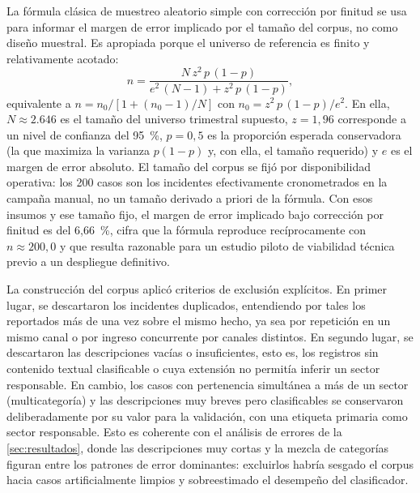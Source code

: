 La fórmula clásica de muestreo aleatorio simple con corrección por finitud se usa para informar el margen de error implicado por el tamaño del corpus, no como diseño muestral. Es apropiada porque el universo de referencia es finito y relativamente acotado:
\[
n = \frac{N\, z^{2}\, p\,(1-p)}{e^{2}\,(N-1) + z^{2}\, p\,(1-p)},
\]
equivalente a \(n = n_0 / [1 + (n_0 - 1)/N]\) con \(n_0 = z^{2}\, p\,(1-p)/e^{2}\). En ella, \(N \approx 2.646\) es el tamaño del universo trimestral supuesto, \(z = 1{,}96\) corresponde a un nivel de confianza del 95~\%, \(p = 0{,}5\) es la proporción esperada conservadora (la que maximiza la varianza \(p(1-p)\) y, con ella, el tamaño requerido) y \(e\) es el margen de error absoluto. El tamaño del corpus se fijó por disponibilidad operativa: los 200 casos son los incidentes efectivamente cronometrados en la campaña manual, no un tamaño derivado a priori de la fórmula. Con esos insumos y ese tamaño fijo, el margen de error implicado bajo corrección por finitud es del 6,66~\%, cifra que la fórmula reproduce recíprocamente con \(n \approx 200{,}0\) y que resulta razonable para un estudio piloto de viabilidad técnica previo a un despliegue definitivo.

La construcción del corpus aplicó criterios de exclusión explícitos. En primer lugar, se descartaron los incidentes duplicados, entendiendo por tales los reportados más de una vez sobre el mismo hecho, ya sea por repetición en un mismo canal o por ingreso concurrente por canales distintos. En segundo lugar, se descartaron las descripciones vacías o insuficientes, esto es, los registros sin contenido textual clasificable o cuya extensión no permitía inferir un sector responsable. En cambio, los casos con pertenencia simultánea a más de un sector (multicategoría) y las descripciones muy breves pero clasificables se conservaron deliberadamente por su valor para la validación, con una etiqueta primaria como sector responsable. Esto es coherente con el análisis de errores de la \autoref{sec:resultados}, donde las descripciones muy cortas y la mezcla de categorías figuran entre los patrones de error dominantes: excluirlos habría sesgado el corpus hacia casos artificialmente limpios y sobreestimado el desempeño del clasificador.

